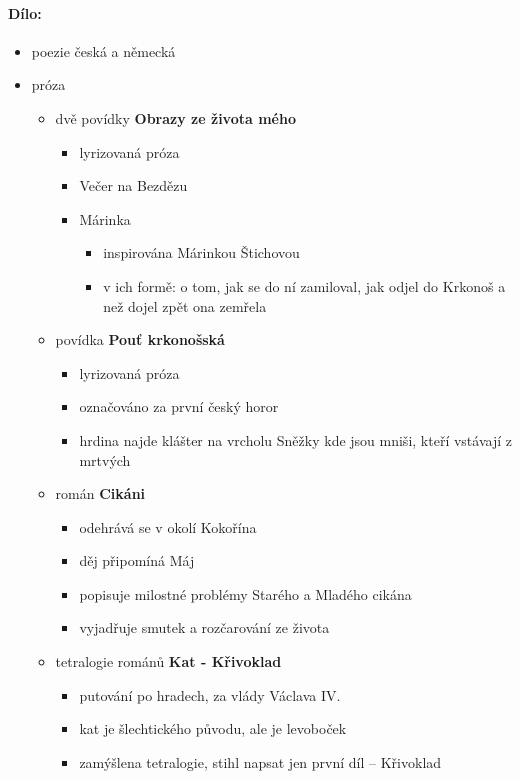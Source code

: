 \paragraph{Dílo:}
\begin{itemize}
\item poezie česká a německá
\item próza
	\begin{itemize}
	\item dvě povídky \textbf{Obrazy ze života mého}
		\begin{itemize}
		\item lyrizovaná próza
		\item Večer na Bezdězu
		\item Márinka
			\begin{itemize}
			\item inspirována Márinkou Štichovou
			\item v ich formě: o tom, jak se do ní zamiloval, jak odjel do Krkonoš a než dojel zpět ona zemřela
			\end{itemize}
		\end{itemize}
	\item povídka \textbf{Pouť krkonošská}
		\begin{itemize}
		\item lyrizovaná próza
		\item označováno za první český horor
		\item hrdina najde klášter na vrcholu Sněžky kde jsou mniši, kteří vstávají z mrtvých
		\end{itemize}
	\item román \textbf{Cikáni}
		\begin{itemize}
		\item odehrává se v okolí Kokořína
		\item děj připomíná Máj
		\item popisuje milostné problémy Starého a Mladého cikána
		\item vyjadřuje smutek a rozčarování ze života
		\end{itemize}
	\item tetralogie románů \textbf{Kat - Křivoklad}
		\begin{itemize}
		\item putování po hradech, za vlády Václava IV. 
		\item kat je šlechtického původu, ale je levoboček 
		\item zamýšlena tetralogie, stihl napsat jen první díl -- Křivoklad
		\end{itemize}

\end{itemize}
\end{itemize}
